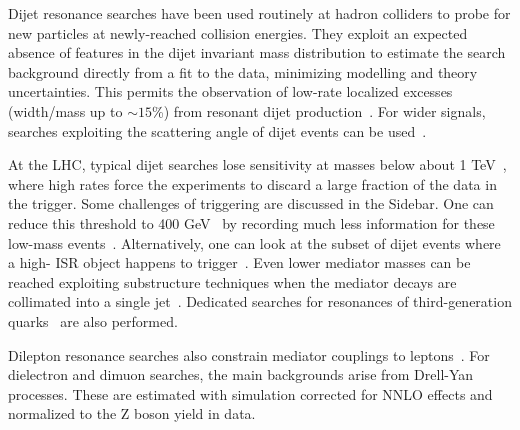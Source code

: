 Dijet resonance searches have been used routinely at hadron colliders to probe for new particles at newly-reached collision energies.
They exploit an expected absence of features in the dijet invariant mass distribution to estimate the search background directly from a fit to the data, minimizing modelling and theory uncertainties.
This permits the observation of low-rate localized excesses (width/mass up to $\sim15$\%) from resonant dijet production~\cite{Aaboud:2017yvp,CMS-PAS-EXO-16-056}.
For wider signals, searches exploiting the scattering angle of dijet events can be used~\cite{CMS-PAS-EXO-16-046,Aaboud:2017yvp}. 



At the LHC, typical dijet searches lose sensitivity at masses below about 1 TeV~\cite{An:2012ue,Dobrescu:2013coa}, where high rates force the experiments to discard a large fraction of the data in the trigger.
Some challenges of triggering are discussed in the Sidebar. 
One can reduce this threshold to 400 GeV~\cite{CMS-PAS-EXO-16-056,ATLAS:2016xiv} by recording much less information for these low-mass events~\cite{Aaij:2016rxn,CMS-PAS-EXO-16-056,Aaboud:2016leb}.
Alternatively, one can look at the subset of dijet events where a high-\pt{} ISR object happens to trigger~\cite{ATLAS:2016bvn,Sirunyan:2017nvi}.
Even lower mediator masses can be reached exploiting substructure techniques when the mediator decays are collimated into a single jet~\cite{Sirunyan:2017nvi,Aaboud:2018zba}.
Dedicated searches for resonances of third-generation quarks~\cite{lowMassDiB,CMS-PAS-HIG-16-025,Aaboud:2017hnm} are also performed.

Dilepton resonance searches also constrain mediator couplings to leptons~\cite{Aaboud:2017buh,Khachatryan:2016zqb}. 
For dielectron and dimuon searches, the main backgrounds arise from Drell-Yan processes. These are estimated with simulation corrected for NNLO effects and normalized to the Z boson yield in data.

